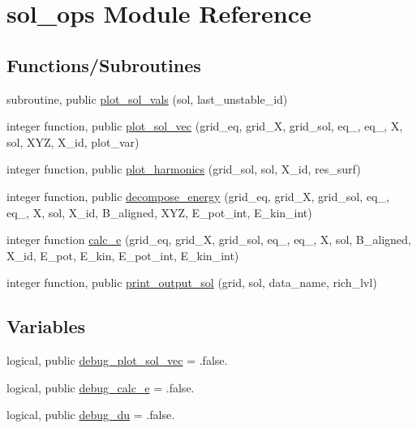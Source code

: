 \hypertarget{namespacesol__ops}{}\section{sol\+\_\+ops Module Reference}
\label{namespacesol__ops}
\subsection*{Functions/\+Subroutines}
\begin{DoxyCompactItemize}
\item 
subroutine, public \hyperlink{namespacesol__ops_a0d4a798a56cfee9bced781d116852165}{plot\+\_\+sol\+\_\+vals} (sol, last\+\_\+unstable\+\_\+id)
\item 
integer function, public \hyperlink{namespacesol__ops_ae14af60a6f8f77e7dde1e93dbaa7e6d0}{plot\+\_\+sol\+\_\+vec} (grid\+\_\+eq, grid\+\_\+X, grid\+\_\+sol, eq\+\_, eq\+\_, X, sol, X\+YZ, X\+\_\+id, plot\+\_\+var)
\item 
integer function, public \hyperlink{namespacesol__ops_ab9a1e138cb94b547f4fd7669c677ed5c}{plot\+\_\+harmonics} (grid\+\_\+sol, sol, X\+\_\+id, res\+\_\+surf)
\item 
integer function, public \hyperlink{namespacesol__ops_a5e15aa2fa915e7de74ce74f02cd35fac}{decompose\+\_\+energy} (grid\+\_\+eq, grid\+\_\+X, grid\+\_\+sol, eq\+\_, eq\+\_, X, sol, X\+\_\+id, B\+\_\+aligned, X\+YZ, E\+\_\+pot\+\_\+int, E\+\_\+kin\+\_\+int)
\item 
integer function \hyperlink{namespacesol__ops_aaeb4b122754fc6a4f538b22d72b6cba0}{calc\+\_\+e} (grid\+\_\+eq, grid\+\_\+X, grid\+\_\+sol, eq\+\_, eq\+\_, X, sol, B\+\_\+aligned, X\+\_\+id, E\+\_\+pot, E\+\_\+kin, E\+\_\+pot\+\_\+int, E\+\_\+kin\+\_\+int)
\item 
integer function, public \hyperlink{namespacesol__ops_abd5b3b2d7008f482dd38f898a3300357}{print\+\_\+output\+\_\+sol} (grid, sol, data\+\_\+name, rich\+\_\+lvl)
\end{DoxyCompactItemize}
\subsection*{Variables}
\begin{DoxyCompactItemize}
\item 
logical, public \hyperlink{namespacesol__ops_ae0df0d66ef4ea0155cfbeb23973c28ac}{debug\+\_\+plot\+\_\+sol\+\_\+vec} = .false.
\item 
logical, public \hyperlink{namespacesol__ops_a4dc364bc6b70b805abdc3ed0ab2e5226}{debug\+\_\+calc\+\_\+e} = .false.
\item 
logical, public \hyperlink{namespacesol__ops_acb6465b87495933920896a52b4298a4c}{debug\+\_\+du} = .false.
\end{DoxyCompactItemize}


